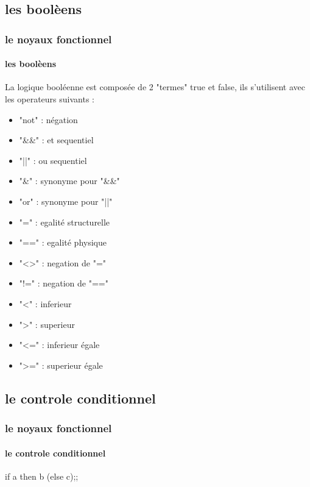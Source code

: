   \subsection{les boolèens}
\begin{frame}
    \frametitle{le noyaux fonctionnel}
    \framesubtitle{les boolèens}
      La logique booléenne est composée de 2 "termes" true et false, ils s'utilisent avec les operateurs suivants :
      \begin{center}
      \begin{minipage}[t]{7cm}
	  \begin{itemize}
	    \item "not" : négation
	    \item "\&\&" : et sequentiel
	    \item "||" : ou sequentiel
	    \item "\&" : synonyme pour "\&\&"
	    \item "or" : synonyme pour "||"
	  \end{itemize}
	\end{minipage}
      \end{center}
	\begin{minipage}[t]{5cm}
	  \begin{itemize}
	    \item "=" : egalité structurelle
	    \item "==" : egalité physique
	    \item "<>" : negation de "="
	    \item "!=" : negation de "=="
	  \end{itemize}
	\end{minipage}
	\begin{minipage}[t]{5cm}
	  \begin{itemize}
	    \item "<" : inferieur 
	    \item ">" : superieur
	    \item "<=" : inferieur égale
	    \item ">=" : superieur égale
	  \end{itemize}
	\end{minipage}
\end{frame}
    \subsection{le controle conditionnel}
\begin{frame}
      \frametitle{le noyaux fonctionnel}
      \framesubtitle{le controle conditionnel}
      \begin{center}
	if a then b (else c);;
  \end{center}
\end{frame}
